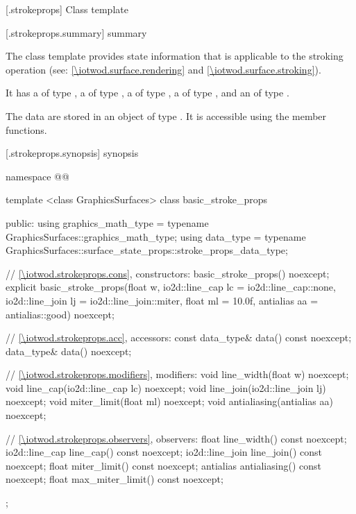 
 [\iotwod.strokeprops] {Class template }

 [\iotwod.strokeprops.summary] { summary}

\pnum
The  class template provides state information that is applicable to the stroking operation (see: \ref{\iotwod.surface.rendering} and \ref{\iotwod.surface.stroking}).

\pnum
It has a  of type , a  of type , a  of type , a  of type , and an  of type .

\pnum
The data are stored in an object of type . It is accessible using the  member functions.

 [\iotwod.strokeprops.synopsis] { synopsis}

\begin{codeblock}
namespace @\fullnamespace{}@ {
  template <class GraphicsSurfaces>
  class basic_stroke_props {
  public:
	using graphics_math_type = typename GraphicsSurfaces::graphics_math_type;
    using data_type =
      typename GraphicsSurfaces::surface_state_props::stroke_props_data_type;

    // \ref{\iotwod.strokeprops.cons}, constructors:
    basic_stroke_props() noexcept;
    explicit basic_stroke_props(float w, io2d::line_cap lc = io2d::line_cap::none,
      io2d::line_join lj = io2d::line_join::miter, float ml = 10.0f,
      antialias aa = antialias::good) noexcept;

    // \ref{\iotwod.strokeprops.acc}, accessors:
    const data_type& data() const noexcept;
    data_type& data() noexcept;

    // \ref{\iotwod.strokeprops.modifiers}, modifiers:
    void line_width(float w) noexcept;
    void line_cap(io2d::line_cap lc) noexcept;
    void line_join(io2d::line_join lj) noexcept;
    void miter_limit(float ml) noexcept;
    void antialiasing(antialias aa) noexcept;

    // \ref{\iotwod.strokeprops.observers}, observers:
    float line_width() const noexcept;
    io2d::line_cap line_cap() const noexcept;
    io2d::line_join line_join() const noexcept;
    float miter_limit() const noexcept;
    antialias antialiasing() const noexcept;
    float max_miter_limit() const noexcept;
  };
}
\end{codeblock}

